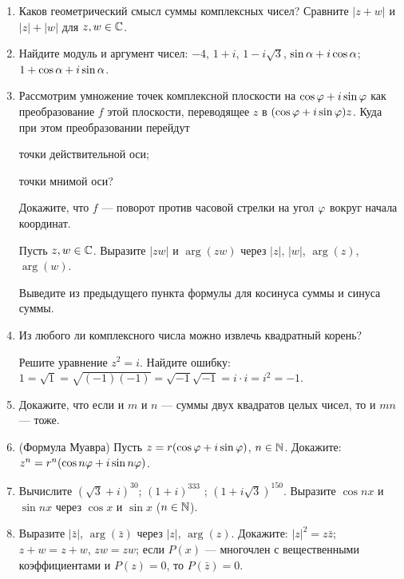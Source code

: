\begin{enumerate}
\item \ipunkt Каков геометрический смысл суммы комплексных чисел? \ipunkt  Сравните $|z + w|$ и $|z| + |w|$ для
$z, w \in \mathbb C$.

\item  Найдите модуль и аргумент чисел: \ipunkt  $-4$, $1 + i$, $1 - i\sqrt 3$, $\sin \alpha + i \cos \alpha$; \ipunkt  $1 + \cos \alpha + i \sin \alpha$.
\item  Рассмотрим умножение точек комплексной плоскости на $\cos \varphi + i \sin \varphi$ как преобразование $f$ этой
плоскости, переводящее $z$ в $(\cos \varphi + i \sin \varphi)z$. Куда при этом преобразовании перейдут

\noindent\ipunkt  точки действительной оси;

\noindent\ipunkt  точки мнимой оси?

\noindent\ipunkt  Докажите, что $f$ — поворот против часовой стрелки на угол $\varphi$ вокруг начала координат.

\noindent\ipunkt  Пусть $z, w \in\mathbb C$. Выразите $|zw|$ и $\arg (zw)$ через $|z|$, $|w|$, $\arg (z)$, $\arg (w)$.

\noindent\ipunkt  Выведите из предыдущего пункта формулы для косинуса суммы и синуса суммы.

\item  \ipunkt Из любого ли комплексного числа можно извлечь  квадратный  корень?

\ipunkt Решите уравнение $z^2 = i$. \ipunkt  Найдите ошибку: $1 = \sqrt1 = \sqrt{(-1)(-1)} = \sqrt{-1}\sqrt{-1} = i\cdot i = i^2 = -1$.
\item  Докажите, что если и $m$ и $n$ — суммы двух квадратов целых чисел, то и $mn$ — тоже.
\item  (Формула Муавра) Пусть $z = r(\cos \varphi + i \sin \varphi)$, $n \in \mathbb N$. Докажите: $z^n = r^n (\cos n\varphi + i \sin n\varphi)$.
\item  Вычислите \ipunkt $(\sqrt 3 + i)^{30}$; \ipunkt  $(1 + i)^{333}$ ; \ipunkt  $(1 + i\sqrt 3)^{150}$. \ipunkt  Выразите $\cos nx$ и $\sin nx$ через $\cos x$ и $\sin x$ ($n \in\mathbb N$).
\item  \ipunkt  Выразите $|\bar z|$, $\arg (\bar z)$ через $|z|$, $\arg (z)$. Докажите: \ipunkt  $|z|^2 = z\bar z$; \ipunkt  $z + w = z + w$, $zw = z w$;
\ipunkt  если $P (x)$ — многочлен с вещественными коэффициентами и $P (z) = 0$, то $P (\bar z) = 0$.
\end{enumerate}





